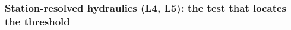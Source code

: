 \documentclass[a4paper,fleqn]{cas-dc}
\begin{document}
\subsubsection{Station-resolved hydraulics (L4, L5): the test that locates the threshold}
\end{document}
